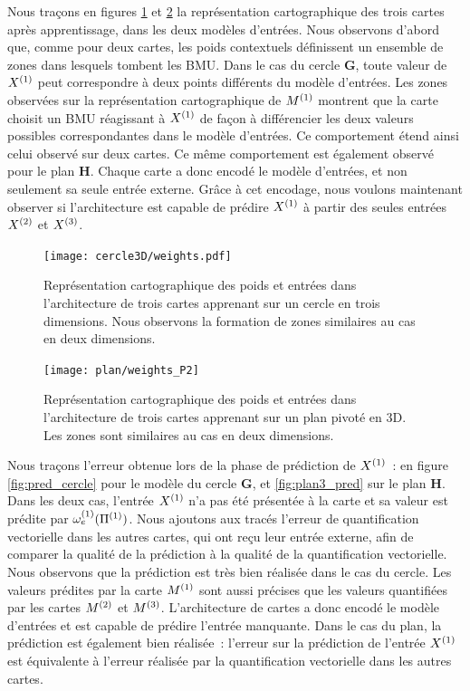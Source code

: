 \documentclass[../main]{subfiles}
\begin{document}
Nous traçons en figures \ref{fig:w_cercle} et \ref{fig:w_plan3} la représentation cartographique des trois cartes après apprentissage, dans les deux modèles d'entrées.
Nous observons d'abord que, comme pour deux cartes, les poids contextuels définissent un ensemble de zones dans lesquels tombent les BMU.
Dans le cas du cercle \textbf{G}, toute valeur de $X^{({1})}$ peut correspondre à deux points différents du modèle d'entrées.
Les zones observées sur la représentation cartographique de $M^{({1})}$ montrent que la carte choisit un BMU réagissant à $X^{({1})}$ de façon à différencier les deux valeurs possibles correspondantes dans le modèle d'entrées. 
Ce comportement étend ainsi celui observé sur deux cartes.
Ce même comportement est également observé pour le plan \textbf{H}.
Chaque carte a donc encodé le modèle d'entrées, et non seulement sa seule entrée externe.
Grâce à cet encodage, nous voulons maintenant observer si l'architecture est capable de prédire $X^{({1})}$ à partir des seules entrées $X^{({2})}$ et $X^{({3})}$.


\begin{figure}[h!]
	\centering\texttt{[image: cercle3D/weights.pdf]}
	\caption{Représentation cartographique des poids et entrées dans l'architecture de trois cartes apprenant sur un cercle en trois dimensions. Nous observons la formation de zones similaires au cas en deux dimensions. \label{fig:w_cercle}}
\end{figure}

\begin{figure}[h!]
	\centering\texttt{[image: plan/weights\_P2]}
	\caption{Représentation cartographique des poids et entrées dans l'architecture de trois cartes apprenant sur un plan pivoté en 3D. Les zones sont similaires au cas en deux dimensions. \label{fig:w_plan3}}
\end{figure}


Nous traçons l'erreur obtenue lors de la phase de prédiction de $X^{({1})}$~: en figure \ref{fig:pred_cercle} pour le modèle du cercle \textbf{G}, et \ref{fig:plan3_pred} sur le plan \textbf{H}.
Dans les deux cas, l'entrée $X^{({1})}$ n'a pas été présentée à la carte et sa valeur est prédite par $\omega_{e}^{({1})}(\Pi^{({1})})$. 
Nous ajoutons aux tracés l'erreur de quantification vectorielle dans les autres cartes, qui ont reçu leur entrée externe, afin de comparer la qualité de la prédiction à la qualité de la quantification vectorielle.
Nous observons que la prédiction est très bien réalisée dans le cas du cercle. Les valeurs prédites par la carte $M^{({1})}$ sont aussi précises que les valeurs quantifiées par les cartes $M^{({2})}$ et $M^{({3})}$.
L'architecture de cartes a donc encodé le modèle d'entrées et est capable de prédire l'entrée manquante.
Dans le cas du plan, la prédiction est également bien réalisée~: l'erreur sur la prédiction de l'entrée $X^{({1})}$ est équivalente à l'erreur réalisée par la quantification vectorielle dans les autres cartes.
\end{document}
